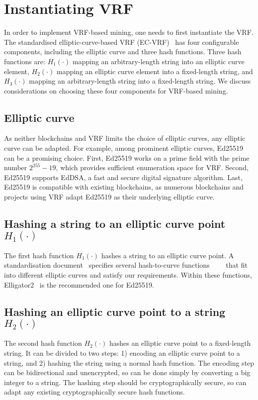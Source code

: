 \section{Instantiating VRF}
\label{sec:instantiation}

In order to implement VRF-based mining, one needs to first instantiate the VRF.
The standardised elliptic-curve-based VRF (EC-VRF)~\cite{goldberg2017draft} has four configurable components, including the elliptic curve and three hash functions.
Three hash functions are:
$H_{1}(\cdot)$ mapping an arbitrary-length string into an elliptic curve element,
$H_{2}(\cdot)$ mapping an elliptic curve element into a fixed-length string, and
$H_{3}(\cdot)$ mapping an arbitrary-length string into a fixed-length string.
We discuss considerations on choosing these four components for VRF-based mining.





\subsection{Elliptic curve}
As neither blockchains and VRF limits the choice of elliptic curves, any elliptic curve can be adapted.
For example, among prominent elliptic curves, Ed25519~\cite{bernstein2012high} can be a promising choice.
First, Ed25519 works on a prime field with the prime number $2^{255} - 19$, which provides sufficient enumeration space for VRF.
Second, Ed25519 supports EdDSA, a fast and secure digital signature algorithm.
Last, Ed25519 is compatible with existing blockchains, as numerous blockchains and projects using VRF adapt Ed25519 as their underlying elliptic curve.



\subsection{Hashing a string to an elliptic curve point $H_{1}(\cdot)$}
The first hash function $H_{1}(\cdot)$ hashes a string to an elliptic curve point.
A standardisation document~\cite{scott2019hashing} specifies several hash-to-curve functions~\cite{icart2009hash}~\cite{ulas2007rational}~\cite{brier2010efficient}~\cite{bernstein2013elligator} that fit into different elliptic curves and satisfy our requirements.
Within these functions, Elligator2~\cite{bernstein2013elligator} is the recommended one for Ed25519.




\subsection{Hashing an elliptic curve point to a string $H_{2}(\cdot)$}
The second hash function $H_{2}(\cdot)$ hashes an elliptic curve point to a fixed-length string.
It can be divided to two steps: 1) encoding an elliptic curve point to a string, and 2) hashing the string using a normal hash function.
The encoding step can be bidirectional and unencrypted, so can be done simply by converting a big integer to a string.
The hashing step should be cryptographically secure, so can adapt any existing cryptographically secure hash functions.


